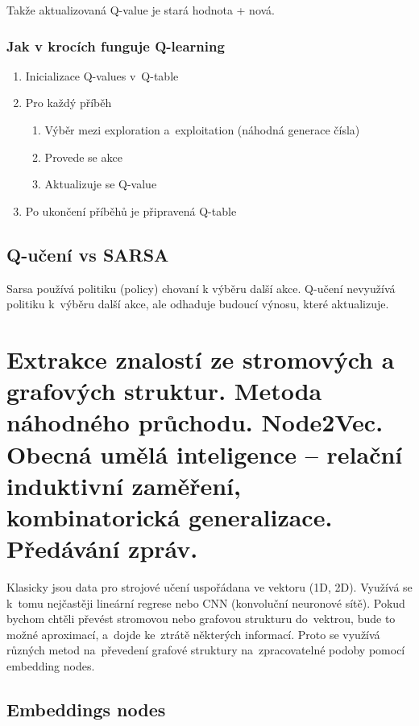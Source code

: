 Takže aktualizovaná Q-value je stará hodnota + nová.


\subsubsection{Jak v krocích funguje Q-learning}

\begin{enumerate}
    \item Inicializace Q-values v~Q-table
    \item Pro každý příběh
    \begin{enumerate}
    	\item Výběr mezi exploration a~exploitation (náhodná generace čísla)
    	\item Provede se akce
    	\item Aktualizuje se Q-value 
    \end{enumerate}
    \item Po ukončení příběhů je připravená Q-table
\end{enumerate}

\subsection{Q-učení vs SARSA}

Sarsa používá politiku (policy) chovaní k výběru další akce.
Q-učení nevyužívá politiku k~výběru další akce, ale odhaduje budoucí výnosu, které aktualizuje.



\clearpage
\section{Extrakce znalostí ze stromových a grafových struktur. Metoda náhodného průchodu. Node2Vec. Obecná umělá inteligence – relační induktivní zaměření, kombinatorická generalizace. Předávání zpráv.}

Klasicky jsou data pro strojové učení uspořádana ve vektoru (1D, 2D). 
Využívá se k~tomu nejčastěji lineární regrese nebo CNN (konvoluční neuronové sítě). 
Pokud bychom chtěli převést stromovou nebo grafovou strukturu do~vektrou, bude to možné aproximací, a~dojde ke~ztrátě některých informací.
Proto se využívá různých metod na~převedení grafové struktury na~zpracovatelné podoby pomocí embedding nodes.

\subsection{Embeddings nodes}

